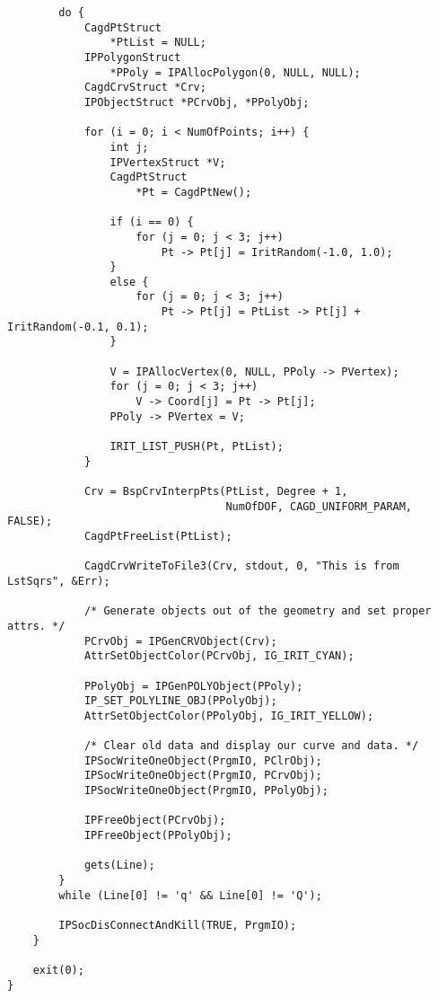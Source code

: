 \begin{verbatim}
        do {
            CagdPtStruct
                *PtList = NULL;
            IPPolygonStruct
                *PPoly = IPAllocPolygon(0, NULL, NULL);
            CagdCrvStruct *Crv;
            IPObjectStruct *PCrvObj, *PPolyObj;

            for (i = 0; i < NumOfPoints; i++) {
                int j;
                IPVertexStruct *V;
                CagdPtStruct
                    *Pt = CagdPtNew();

                if (i == 0) {
                    for (j = 0; j < 3; j++)
                        Pt -> Pt[j] = IritRandom(-1.0, 1.0);
                }
                else {
                    for (j = 0; j < 3; j++)
                        Pt -> Pt[j] = PtList -> Pt[j] + IritRandom(-0.1, 0.1);
                }

                V = IPAllocVertex(0, NULL, PPoly -> PVertex);
                for (j = 0; j < 3; j++)
                    V -> Coord[j] = Pt -> Pt[j];
                PPoly -> PVertex = V;

                IRIT_LIST_PUSH(Pt, PtList);
            }

            Crv = BspCrvInterpPts(PtList, Degree + 1,
                                  NumOfDOF, CAGD_UNIFORM_PARAM, FALSE);
            CagdPtFreeList(PtList);

            CagdCrvWriteToFile3(Crv, stdout, 0, "This is from LstSqrs", &Err);

            /* Generate objects out of the geometry and set proper attrs. */
            PCrvObj = IPGenCRVObject(Crv);
            AttrSetObjectColor(PCrvObj, IG_IRIT_CYAN);

            PPolyObj = IPGenPOLYObject(PPoly);
            IP_SET_POLYLINE_OBJ(PPolyObj);
            AttrSetObjectColor(PPolyObj, IG_IRIT_YELLOW);

            /* Clear old data and display our curve and data. */
            IPSocWriteOneObject(PrgmIO, PClrObj);
            IPSocWriteOneObject(PrgmIO, PCrvObj);
            IPSocWriteOneObject(PrgmIO, PPolyObj);

            IPFreeObject(PCrvObj);
            IPFreeObject(PPolyObj);

            gets(Line);
        }
        while (Line[0] != 'q' && Line[0] != 'Q');

        IPSocDisConnectAndKill(TRUE, PrgmIO);
    }

    exit(0);
}
\end{verbatim}
